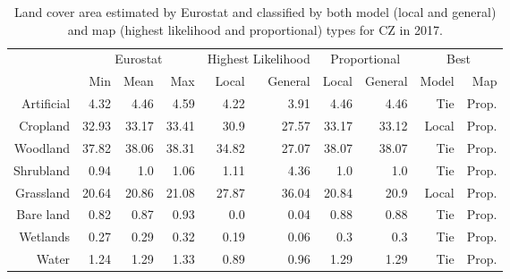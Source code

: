 \begin{table}[H]
\centering
\caption{Land cover area estimated by Eurostat and classified by both model (local and general) and map (highest likelihood and proportional) types for CZ in 2017.}

\begin{tabular}{r|rrr|rr|rr|rr}
\toprule
{} & \multicolumn{3}{|c}{Eurostat} & \multicolumn{2}{|c}{Highest Likelihood} & \multicolumn{2}{|c}{Proportional} & \multicolumn{2}{|c}{Best} \\
{} &      Min &   Mean &    Max &              Local & General &        Local & General &  Model &    Map \\
\midrule
Artificial &     4.32 &   4.46 &   4.59 &               4.22 &    3.91 &         4.46 &    4.46 &    Tie &  Prop. \\
Cropland   &    32.93 &  33.17 &  33.41 &               30.9 &   27.57 &        33.17 &   33.12 &  Local &  Prop. \\
Woodland   &    37.82 &  38.06 &  38.31 &              34.82 &   27.07 &        38.07 &   38.07 &    Tie &  Prop. \\
Shrubland  &     0.94 &    1.0 &   1.06 &               1.11 &    4.36 &          1.0 &     1.0 &    Tie &  Prop. \\
Grassland  &    20.64 &  20.86 &  21.08 &              27.87 &   36.04 &        20.84 &    20.9 &  Local &  Prop. \\
Bare land  &     0.82 &   0.87 &   0.93 &                0.0 &    0.04 &         0.88 &    0.88 &    Tie &  Prop. \\
Wetlands   &     0.27 &   0.29 &   0.32 &               0.19 &    0.06 &          0.3 &     0.3 &    Tie &  Prop. \\
Water      &     1.24 &   1.29 &   1.33 &               0.89 &    0.96 &         1.29 &    1.29 &    Tie &  Prop. \\
\bottomrule
\end{tabular}
\end{table}

